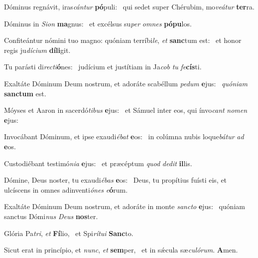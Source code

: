 \item Dóminus regnávit, iras\textit{cántur} \textbf{pó}puli:~\psstar{} qui sedet super Chérubim, mo\textit{veátur} \textbf{ter}ra.
\item Dóminus in \textit{Sion} \textbf{ma}gnus:~\psstar{} et excélsus su\textit{per} \textit{omnes} \textbf{pó}\textbf{pu}los.
\item Confiteántur nómini tuo magno: quóniam terríbi\textit{le}, \textit{et} \textbf{sanc}tum est:~\psstar{} et honor regis ju\textit{dícium} \textbf{dí}\textbf{li}git.
\item Tu parásti di\textit{recti}\textbf{ó}nes:~\psstar{} judícium et justítiam in Ja\textit{cob} \textit{tu} \textit{fe}\textbf{cís}ti.
\item Exaltáte Dóminum Deum nostrum, et adoráte scabéllum \textit{pedum} \textbf{e}jus:~\psstar{} \textit{quóniam} \textbf{sanc}\textbf{tum} est.
\item Móyses et Aaron in sacerdó\textit{tibus} \textbf{e}jus:~\psstar{} et Sámuel inter eos, qui ínvo\textit{cant} \textit{nomen} \textbf{e}jus:
\item Invocábant Dóminum, et ipse exaudi\textit{ébat} \textbf{e}os:~\psstar{} in colúmna nubis loque\textit{bátur} \textit{ad} \textbf{e}os.
\item Custodiébant testimó\textit{nia} \textbf{e}jus:~\psstar{} et præcéptum \textit{quod} \textit{dedit} \textbf{il}lis.
\item Dómine, Deus noster, tu exaudi\textit{ébas} \textbf{e}os:~\psstar{} Deus, tu propítius fuísti eis, et ulcíscens in omnes adinventi\textit{ónes} \textit{e}\textbf{ó}rum.
\item Exaltáte Dóminum Deum nostrum, et adoráte in monte \textit{sancto} \textbf{e}jus:~\psstar{} quóniam sanctus Dómi\textit{nus} \textit{Deus} \textbf{nos}ter.
\item Glória Pa\textit{tri}, \textit{et} \textbf{Fí}lio,~\psstar{} et Spi\textit{rítui} \textbf{Sanc}to.
\item Sicut erat in princípio, et \textit{nunc}, \textit{et} \textbf{sem}per,~\psstar{} et in sǽcula sæ\textit{culórum}. \textbf{A}men.

